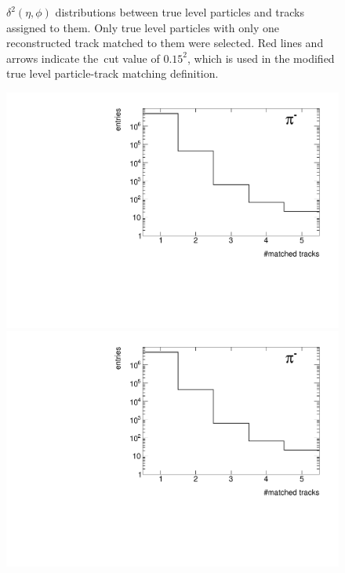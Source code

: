 \begin{figure}[hb]
{	}%
	\caption[$\delta^{2}\left(\eta,\phi\right)$ distributions between true level particles and tracks assigned to them.]{$\delta^{2}\left(\eta,\phi\right)$ distributions  between true level particles and tracks assigned to them. Only true level particles with only one reconstructed track matched to them were selected. Red lines and arrows indicate  the~cut value of $0.15^2$, which is used in the modified true level particle-track matching definition.}\label{fig:trackSplittingNominalDelta_1}
\end{figure}

\begin{figure}[h!]\vspace{-10pt}
	\centering
	\parbox{0.329\textwidth}{
		\centering
		\includegraphics[width=\linewidth,page=19]{graphics/eff/trackSplitting_CD.pdf}\\
		\includegraphics[width=\linewidth,page=22]{graphics/eff/trackSplitting_CD.pdf}\\
}
\end{figure}
